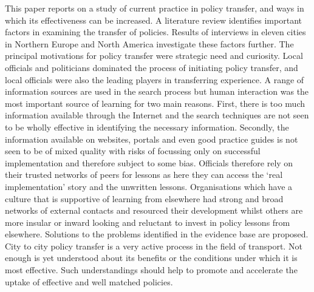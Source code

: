 This paper reports on a study of current practice in policy transfer, and ways in which its effectiveness can be increased. A literature review identifies important factors in examining the transfer of policies. Results of interviews in eleven cities in Northern Europe and North America investigate these factors further. The principal motivations for policy transfer were strategic need and curiosity. Local officials and politicians dominated the process of initiating policy transfer, and local officials were also the leading players in transferring experience. A range of information sources are used in the search process but human interaction was the most important source of learning for two main reasons. First, there is too much information available through the Internet and the search techniques are not seen to be wholly effective in identifying the necessary information. Secondly, the information available on websites, portals and even good practice guides is not seen to be of mixed quality with risks of focussing only on successful implementation and therefore subject to some bias. Officials therefore rely on their trusted networks of peers for lessons as here they can access the ‘real implementation’ story and the unwritten lessons. Organisations which have a culture that is supportive of learning from elsewhere had strong and broad networks of external contacts and resourced their development whilst others are more insular or inward looking and reluctant to invest in policy lessons from elsewhere. Solutions to the problems identified in the evidence base are proposed. City to city policy transfer is a very active process in the field of transport. Not enough is yet understood about its benefits or the conditions under which it is most effective. Such understandings should help to promote and accelerate the uptake of effective and well matched policies.
